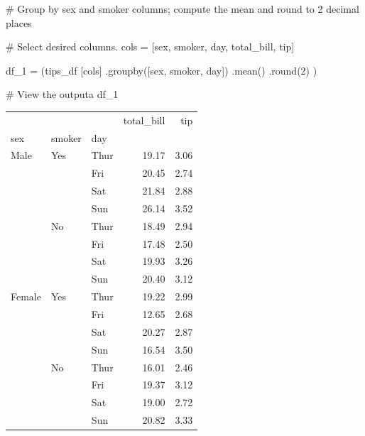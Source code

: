 \documentclass[
  letterpaper,
  DIV=11,
  numbers=noendperiod]{scrartcl}
\newenvironment{Shaded}{\begin{snugshade}}{\end{snugshade}}
\newcommand{\BuiltInTok}[1]{\textcolor[rgb]{0.00,0.46,0.62}{#1}}
\newcommand{\CommentTok}[1]{\textcolor[rgb]{0.37,0.37,0.37}{#1}}
\newcommand{\DecValTok}[1]{\textcolor[rgb]{0.68,0.00,0.00}{#1}}
\newcommand{\NormalTok}[1]{\textcolor[rgb]{0.00,0.46,0.62}{#1}}
\newcommand{\OperatorTok}[1]{\textcolor[rgb]{0.37,0.37,0.37}{#1}}
\newcommand{\StringTok}[1]{\textcolor[rgb]{0.13,0.47,0.30}{#1}}
\begin{document}
\begin{Shaded}
\begin{Highlighting}[]
\CommentTok{\# Group by sex and smoker columns; compute the mean and round to 2 decimal places}

\CommentTok{\# Select desired columns.}
\NormalTok{cols }\OperatorTok{=}\NormalTok{ [}\StringTok{\textquotesingle{}sex\textquotesingle{}}\NormalTok{, }\StringTok{\textquotesingle{}smoker\textquotesingle{}}\NormalTok{, }\StringTok{\textquotesingle{}day\textquotesingle{}}\NormalTok{, }\StringTok{\textquotesingle{}total\_bill\textquotesingle{}}\NormalTok{, }\StringTok{\textquotesingle{}tip\textquotesingle{}}\NormalTok{]}

\NormalTok{df\_1 }\OperatorTok{=}\NormalTok{ (tips\_df}
\NormalTok{       [cols]}
\NormalTok{       .groupby([}\StringTok{\textquotesingle{}sex\textquotesingle{}}\NormalTok{, }\StringTok{\textquotesingle{}smoker\textquotesingle{}}\NormalTok{, }\StringTok{\textquotesingle{}day\textquotesingle{}}\NormalTok{])}
\NormalTok{       .mean()}
\NormalTok{       .}\BuiltInTok{round}\NormalTok{(}\DecValTok{2}\NormalTok{)}
\NormalTok{)}

\CommentTok{\# View the outputa}
\NormalTok{df\_1}
\end{Highlighting}
\end{Shaded}

\begin{tabular}{lllrr}
\toprule
       &    &     &  total\_bill &   tip \\
sex & smoker & day &             &       \\
\midrule
Male & Yes & Thur &       19.17 &  3.06 \\
       &    & Fri &       20.45 &  2.74 \\
       &    & Sat &       21.84 &  2.88 \\
       &    & Sun &       26.14 &  3.52 \\
       & No & Thur &       18.49 &  2.94 \\
       &    & Fri &       17.48 &  2.50 \\
       &    & Sat &       19.93 &  3.26 \\
       &    & Sun &       20.40 &  3.12 \\
Female & Yes & Thur &       19.22 &  2.99 \\
       &    & Fri &       12.65 &  2.68 \\
       &    & Sat &       20.27 &  2.87 \\
       &    & Sun &       16.54 &  3.50 \\
       & No & Thur &       16.01 &  2.46 \\
       &    & Fri &       19.37 &  3.12 \\
       &    & Sat &       19.00 &  2.72 \\
       &    & Sun &       20.82 &  3.33 \\
\bottomrule
\end{tabular}
\end{document}
